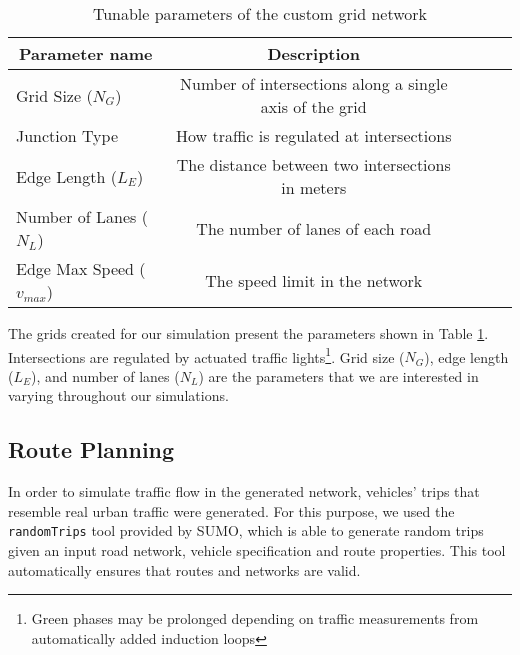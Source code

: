 \begin{table}[h!]
    \centering
    \caption{Tunable parameters of the custom grid network}
    \label{table:grid_params}
    \begin{tabular}{@{} l *4c @{}}
    \toprule
     \multicolumn{1}{c}{Parameter name} & Description \\ 
    \midrule
    Grid Size ($N_G$) & Number of intersections along a single axis of the grid \\ 
    Junction Type & How traffic is regulated at intersections \\ 
    Edge Length ($L_E$) & The distance between two intersections in meters\\
    Number of Lanes ($N_L$) & The number of lanes of each road \\
    Edge Max Speed ($v_{max}$) & The speed limit in the network \\
    \bottomrule
    \end{tabular}
\end{table}

The grids created for our simulation present the parameters shown in Table \ref{table:grid_params}. Intersections are regulated by actuated traffic lights\footnote{Green phases may be prolonged depending on traffic measurements from automatically added induction loops}. Grid size ($N_G$), edge length ($L_E$), and number of lanes ($N_L$) are the parameters that we are interested in varying throughout our simulations.


\subsection{Route Planning}
\label{sec:trip_generation}

In order to simulate traffic flow in the generated network, vehicles' trips that resemble real urban traffic were generated. For this purpose, we used the \verb|randomTrips| tool provided by SUMO, which is able to generate random trips given an input road network, vehicle specification and route properties. This tool automatically ensures that routes and networks are valid. 

